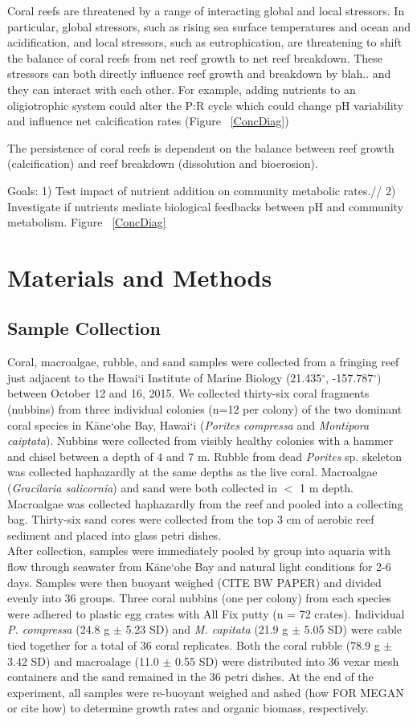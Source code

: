 \documentclass{article}%
\begin{document}
Coral reefs are threatened by a range of interacting global and local stressors.  In particular, global stressors, such as rising sea surface temperatures and ocean and acidification, and local stressors, such as eutrophication, are threatening to shift the balance of coral reefs from net reef growth to net reef breakdown.  These stressors can both directly influence reef growth and breakdown by blah.. and they can interact with each other. For example, adding  nutrients to an oligiotrophic system could alter the P:R cycle which could change pH variability and influence net calcification rates (Figure ~\ref{ConcDiag})

The persistence of coral reefs is dependent on the balance between reef growth (calcification) and reef breakdown (dissolution and bioerosion).

Goals: 1) Test impact of nutrient addition on community metabolic rates.//
2) Investigate if nutrients mediate biological feedbacks between pH and community metabolism.
Figure ~\ref{ConcDiag}

\section{Materials and Methods}
\subsection{Sample Collection}
 Coral, macroalgae, rubble, and sand samples were collected from a fringing reef just adjacent to the Hawai`i Institute of Marine Biology (21.435$^{\circ}$, -157.787$^{\circ}$) between October 12 and 16, 2015. We collected thirty-six coral fragments (nubbins) from three individual colonies (n=12 per colony) of the two dominant coral species in  K\={a}ne`ohe Bay, Hawai`i (\textit{Porites compressa} and \textit{Montipora caiptata}). Nubbins were collected from visibly healthy colonies with a hammer and chisel between a depth of 4 and 7 m. Rubble from dead \textit{Porites} sp. skeleton was collected haphazardly at the same depths as the live coral. Macroalgae (\textit{Gracilaria salicornia}) and sand were both collected in $<$ 1 m depth. Macroalgae was collected haphazardly from the reef and pooled into a collecting bag. Thirty-six sand cores were collected from the top 3 cm of aerobic reef sediment and placed into glass petri dishes. \\
\indent After collection, samples were immediately pooled by group into aquaria with flow through seawater from K\={a}ne`ohe Bay and natural light conditions for 2-6 days. Samples were then buoyant weighed (CITE BW PAPER) and divided evenly into 36 groups. Three coral nubbins (one per colony) from each species were adhered to plastic egg crates with All Fix putty (n = 72 crates). Individual \textit{P. compressa} (24.8 g $\pm$ 5.23 SD) and \textit{M. capitata} (21.9 g $\pm$ 5.05 SD) were cable tied together for a total of 36 coral replicates. Both the coral rubble (78.9 g $\pm$ 3.42 SD) and macroalage (11.0 $\pm$ 0.55 SD) were distributed into 36 vexar mesh containers and the sand remained in the 36 petri dishes. At the end of the experiment, all samples were re-buoyant weighed and ashed (how FOR MEGAN or cite how) to determine growth rates and organic biomass, respectively.
 
\end{document}
